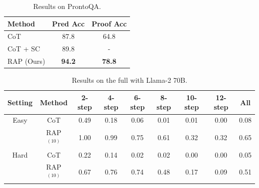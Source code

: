 
\begin{table}
\centering
\small
\begin{tabular}{l c c}
    \toprule
    \textbf{Method} & \textbf{Pred Acc} & \textbf{Proof Acc} \\
    \midrule
    CoT & 87.8 & 64.8 \\
    CoT + SC & 89.8 & - \\
    \midrule
    RAP (Ours) & \textbf{94.2} & \textbf{78.8} \\
    \bottomrule
\end{tabular}
\vspace{-5pt}
\caption{Results on ProntoQA.}
\vspace{-15pt}
\label{tab:prontoqa}
\end{table}


\begin{table}[ht!]
    \small
    \centering
    \begin{tabular}{c c c c c c c c c}
        \toprule
        \textbf{Setting} & \textbf{Method} & \textbf{2-step} & \textbf{4-step} & \textbf{6-step} & \textbf{8-step} & \textbf{10-step} & \textbf{12-step} & \textbf{All}\\
        \midrule
        Easy & CoT & 0.49 & 0.18 & 0.06 & 0.01 & 0.01 & 0.00 & 0.08\\
        & RAP$^{(10)}$ & 1.00 & 0.99 & 0.75 & 0.61 & 0.32& 0.32 & 0.65\\
        \midrule
        Hard & CoT & 0.22 & 0.14 & 0.02 & 0.02 & 0.00 & 0.00 & 0.05\\
        & RAP$^{(10)}$ & 0.67 & 0.76 & 0.74 & 0.48 & 0.17 & 0.09 & 0.51 \\
        \bottomrule
    \end{tabular}
    \vspace{-5pt}
    \caption{Results on the full \blocksworld with Llama-2 70B.}
    \label{tab:bw_full}
    \vspace{-15pt}
\end{table}


